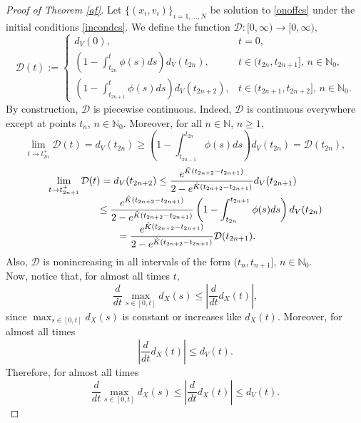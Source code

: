 \documentclass[a4paper,11pt,oneside]{article}
\begin{document}
\begin{proof}[Proof of Theorem \ref{af}]
	Let $\{(x_{i},v_{i})\}_{i=1,\dots,N}$  be solution to \eqref{onoffcs} under the initial conditions \eqref{incondcs}. We define the function $\mathcal{D}:[0,\infty)\rightarrow [0,\infty),$ 
	$$\mathcal{D}(t):=\begin{cases}
		d_{V}(0), &t=0,\\\left(1-\int_{t_{2n}}^{t}\phi(s)ds\right)d_V(t_{2n}), &t\in (t_{2n},t_{2n+1}],\,n\in \mathbb{N}_0,\\\left(1-\int_{t_{2n+1}}^{t}\phi(s)ds\right)d_V(t_{2n+2}),&t\in (t_{2n+1},t_{2n+2}],\,n\in \mathbb{N}_0.
	\end{cases}$$
	By construction, $\mathcal{D}$ is piecewise continuous. Indeed, $\mathcal{D}$ is continuous everywhere except at points $t_n$, $n\in\mathbb{N}_0$. Moreover, for all $n\in \mathbb{N}$, $n\ge 1,$
	\begin{equation}\label{limt2n}
		\lim_{t\to t^{+}_{2n}}\mathcal{D}(t)=d_V(t_{2n})\geq \left(1-\int_{t_{2n-1}}^{t_{2n}}\phi(s)ds\right)d_V(t_{2n})=\mathcal{D}(t_{2n}),
	\end{equation}
	\begin{equation}\label{limt2n+1}
		\begin{array}{l}
			\displaystyle{\lim_{t\to t^{+}_{2n+1}}\mathcal{D}(t)=d_V(t_{2n+2})\leq \frac{e^{\tilde K(t_{2n+2}-t_{2n+1})}}{2-e^{\tilde K(t_{2n+2}-t_{2n+1})}}d_V(t_{2n+1})}\\
\displaystyle{\hspace{1,8 cm}\leq \frac{e^{\tilde K(t_{2n+2}-t_{2n+1})}}{2-e^{\tilde K(t_{2n+2}-t_{2n+1})}}\left(1-\int_{t_{2n}}^{t_{2n+1}}\phi(s)ds\right)d_V(t_{2n})}\\
\displaystyle{
\hspace{2,5 cm}
=\frac{e^{\tilde K(t_{2n+2}-t_{2n+1})}}{2-e^{\tilde K(t_{2n+2}-t_{2n+1})}}\mathcal{D}(t_{2n+1}).}
		\end{array}
	\end{equation}
	Also, $\mathcal{D}$ is nonincreasing in all intervals of the form $(t_{n},t_{n+1}]$, $n\in \mathbb{N}_0$.
	\\Now, notice that, for almost all times $t,$ 
$$\frac{d}{dt}\max_{s\in [0,t]}d_{X}(s)\leq \left\lvert \frac{d}{dt}d_{X}(t)\right\rvert,$$
	since $\max_{s\in [0,t]}d_{X}(s)$ is constant or increases like $d_{X}(t)$. Moreover, for almost all times $$\left\lvert \frac{d}{dt}d_{X}(t)\right\rvert\leq d_{V}(t).$$
	Therefore, for almost all times
	\begin{equation}\label{maxcs}
		\frac{d}{dt}\max_{s\in [0,t]}d_{X}(s)\leq \left\lvert \frac{d}{dt}d_{X}(t)\right\rvert\leq  d_{V}(t).

\end{equation}
\end{proof}
\end{document}
